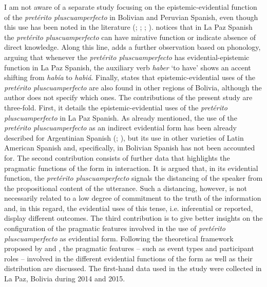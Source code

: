 \documentclass[output=paper]{langsci/langscibook}
\begin{document}
I am not aware of a separate study focusing on the epistemic-evidential function of the \textit{pretérito pluscuamperfecto} in Bolivian and Peruvian Spanish, even though this use has been noted in the literature (\citealt[222--225]{Laprade1981}; \citealt[196--203]{Mendoza1991}; \citealt[306--308]{CallisayaApaza2012}; \citealt{Adelaar2004}). \citet[223]{Laprade1981} notices that in La Paz Spanish the \textit{pretérito pluscuamperfecto} can have mirative function or indicate absence of direct knowledge. Along this line, \citet[199]{Mendoza1991} adds a further observation based on phonology, arguing that whenever the \textit{pretérito pluscuamperfecto} has evidential-epistemic function in La Paz Spanish, the auxiliary verb \textit{haber} ‘to have’ shows an accent shifting from \textit{había} to \textit{habiá}. Finally, \citet[307]{CallisayaApaza2012} states that epistemic-evidential uses of the \textit{pretérito pluscuamperfecto} are also found in other regions of Bolivia, although the author does not specify which ones. The contributions of the present study are three-fold. First, it details the epistemic-evidential uses of the \textit{pretérito pluscuamperfecto} in La Paz Spanish. As already mentioned, the use of the \textit{pretérito pluscuamperfecto} as an indirect evidential form has been already described for Argentinian Spanish (\citealt{Speranza2014}; \citealt{Bermudez2008}), but its use in other varieties of Latin American Spanish and, specifically, in Bolivian Spanish has not been accounted for. The second contribution consists of further data that highlights the pragmatic functions of the form in interaction. It is argued that, in its evidential function, the \textit{pretérito pluscuamperfecto} signals the distancing of the speaker from the propositional content of the utterance. Such a distancing, however, is not necessarily related to a low degree of commitment to the truth of the information and, in this regard, the evidential uses of this tense, i.e. inferential or reported, display different outcomes. The third contribution is to give better insights on the configuration of the pragmatic features involved in the use of \textit{pretérito pluscuamperfecto} as evidential form. Following the theoretical framework proposed by \citet{Kockelman2004} and \citet{Bergqvist2018c}, the pragmatic features – such as event types and participant roles – involved in the different evidential functions of the form as well as their distribution are discussed. The first-hand data used in the study were collected in La Paz, Bolivia during 2014 and 2015.
\end{document}
